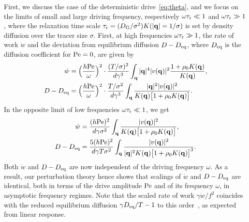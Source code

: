 \documentclass[superscriptaddress, twocolumn, prx, longbibliography, nofootinbib]{revtex4-1}
\begin{document}
First, we discuss the case of the deterministic drive~\eqref{eq:theta}, and we focus on the limits of small and large driving frequency, respectively $\omega\tau_{\rm r}\ll 1$ and $\omega\tau_{\rm r}\gg 1$, where the relaxation time scale $\tau_{\rm r}=(D_{\rm G}/\sigma^2)K(|{\bf q}|=1/\sigma)$ is set by density diffusion over the tracer size $\sigma$. First, at high frequencies $\omega\tau_{\rm r}\gg 1$, the rate of work $\dot w$ and the deviation from equilibrium diffusion $D-D_{\rm eq}$, where $D_{\rm eq}$ is the diffusion coefficient for ${\rm Pe}=0$, are given by
\begin{equation}\label{eq:large}
	\begin{aligned}
		\dot w &= \Big(\frac{h{\rm Pe}}{\omega}\Big)^2 \cdot \frac{(T/\sigma)^2}{d\gamma^3} \int_{\bf q} |{\bf q}|^4 |v({\bf q})|^2 \frac{1 + \rho_0K({\bf q})}{K({\bf q})} ,
		\\
		D-D_{\rm eq} &= \Big(\frac{h{\rm Pe}}{\omega}\Big)^2 \cdot \frac{T /\sigma^2}{d\gamma^3} \int_{\bf q}\frac{|{\bf q}|^2 |v({\bf q})|^2 } {K({\bf q})\big[1 + \rho_0 K({\bf q})\big]} .
	\end{aligned}
\end{equation}
In the opposite limit of low frequencies $\omega\tau_{\rm r}\ll 1$, we get
\begin{equation}\label{eq:small}
	\begin{aligned}
		\dot w &= \frac{(h{\rm Pe})^2}{d\gamma\sigma^2} \int_{\bf q} \frac{|v({\bf q})|^2}{K({\bf q})\big[1 + \rho_0K({\bf q})\big]} ,
		\\
		D - D_{\rm eq} &= \frac{5(h{\rm Pe})^2}{d\gamma T\sigma^2} \int_{\bf q} \frac{|v({\bf q})|^2}{|{\bf q}|^2K({\bf q})\big[1 + \rho_0K({\bf q})\big]^3} .
	\end{aligned}
\end{equation}
Both $\dot w$ and $D-D_{\rm eq}$ are now independent of the driving frequency $\omega$. As a result, our perturbation theory hence shows that scalings of $\dot w$ and $D-D_{\rm eq}$ are identical, both in terms of the drive amplitude $\rm Pe$ and of its frequency $\omega$, in asymptotic frequency regimes. Note that the scaled rate of work $\gamma\dot w/f^2$ coincides with the reduced equilibrium diffusion $\gamma D_{\rm eq}/T-1$ to this order~\cite{Demery2011, Demery2014}, as expected from linear response.
\end{document}
